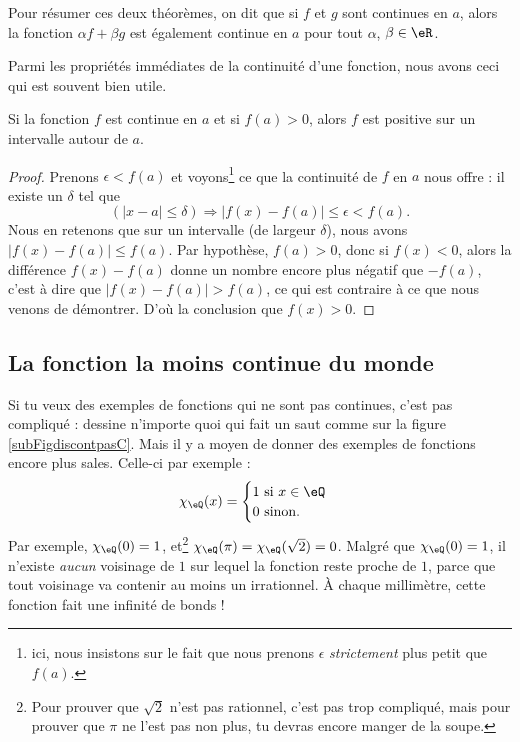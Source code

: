 \documentclass{article}
\begin{document}
Pour résumer ces deux théorèmes, on dit que si $f$ et $g$ sont continues en $a$, alors la fonction $\alpha f+\beta g$ est également continue en $a$ pour tout $\alpha$, $\beta\in\eR$.

Parmi les propriétés immédiates de la continuité d'une fonction, nous avons ceci qui est souvent bien utile.

\begin{corollary}
Si la fonction $f$ est continue en $a$ et si $f(a)>0$, alors $f$ est positive sur un intervalle autour de $a$.
\end{corollary}

\begin{proof}
Prenons $\epsilon<f(a)$ et voyons\footnote{ici, nous insistons sur le fait que nous prenons $\epsilon$ \emph{strictement} plus petit que $f(a)$.} ce que la continuité de $f$ en $a$ nous offre : il existe un $\delta$ tel que
\[ 
  (| x-a |\leq \delta)\Rightarrow | f(x)-f(a) |\leq\epsilon < f(a).
\]
Nous en retenons que sur un intervalle (de largeur $\delta$), nous avons $| f(x)-f(a) |\leq f(a)$. Par hypothèse, $f(a)>0$, donc si $f(x)<0$, alors la différence $f(x)-f(a)$ donne un nombre encore plus négatif que $-f(a)$, c'est à dire que $| f(x)-f(a) |>f(a)$, ce qui est contraire à ce que nous venons de démontrer. D'où la conclusion que $f(x)>0$.
\end{proof}


\subsection{La fonction la moins continue du monde}

Si tu veux des exemples de fonctions qui ne sont pas continues, c'est pas compliqué : dessine n'importe quoi qui fait un saut comme sur la figure \ref{subFigdiscontpasC}. Mais il y a moyen de donner des exemples de fonctions encore plus sales. Celle-ci par exemple :
\[ 
  \chi_{\eQ}(x)=
\begin{cases}
	1 \text{ si $x\in\eQ$}\\
	0 \text{ sinon.}
\end{cases}
\]
Par exemple, $\chi_{\eQ}(0)=1$, et\footnote{Pour prouver que $\sqrt{2}$ n'est pas rationnel, c'est pas trop compliqué, mais pour prouver que $\pi$ ne l'est pas non plus, tu devras encore manger de la soupe.} $\chi_{\eQ}(\pi)=\chi_{\eQ}(\sqrt{2})=0$. Malgré que $\chi_{\eQ}(0)=1$, il n'existe \emph{aucun} voisinage de $1$ sur lequel la fonction reste proche de $1$, parce que tout voisinage va contenir au moins un irrationnel. À chaque millimètre, cette fonction fait une infinité de bonds !
\end{document}
